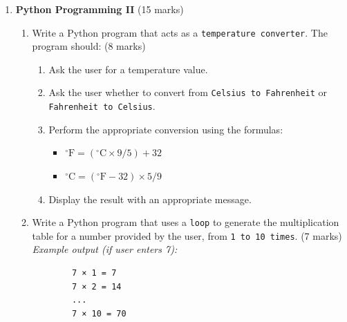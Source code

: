 \documentclass[12pt]{article}
\begin{document}
\begin{enumerate}[left=0pt, label=\bfseries Q\arabic*.]
    \item \textbf{Python Programming II} \hfill (15 marks)
    \begin{enumerate}[label=(\alph*)]
        \item Write a Python program that acts as a \texttt{temperature converter}. The program should: \hfill (8 marks)
        \begin{enumerate}
            \item Ask the user for a temperature value.
            \item Ask the user whether to convert from \texttt{Celsius to Fahrenheit} or \texttt{Fahrenheit to Celsius}.
            \item Perform the appropriate conversion using the formulas:
            \begin{itemize}
                \item $^\circ\mathrm{F} = (^\circ\mathrm{C} \times 9/5) + 32$
                \item $^\circ\mathrm{C} = (^\circ\mathrm{F} - 32) \times 5/9$
            \end{itemize}
            \item Display the result with an appropriate message.
        \end{enumerate}
        \item Write a Python program that uses a \texttt{loop} to generate the multiplication table for a number provided by the user, from \texttt{1 to 10 times}. \hfill (7 marks) \\
        \emph{Example output (if user enters 7):}
        \begin{verbatim}
        7 × 1 = 7
        7 × 2 = 14
        ...
        7 × 10 = 70
        \end{verbatim}
    \end{enumerate}


\end{enumerate}
\end{document}

